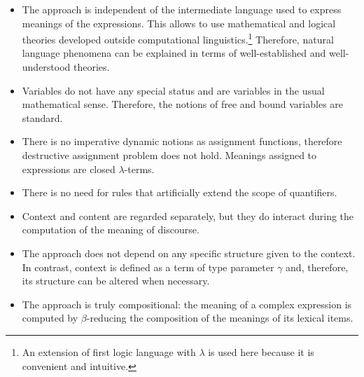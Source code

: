\begin{itemize}

\item The approach is independent of the intermediate language used to express meanings of the expressions. This allows to use mathematical and logical theories developed outside computational linguistics.\footnote{An extension of first logic language with $\lambda$ is used here because it is convenient and intuitive.} Therefore, natural language phenomena can be explained in terms of well-established and well-understood theories.

\item Variables do not have any special status and are variables in the usual mathematical sense. Therefore, the notions of free and bound variables are standard.  

\item There is no imperative dynamic notions as assignment functions, therefore destructive assignment problem does not hold. Meanings assigned to expressions are closed $\lambda$-terms. 

\item There is no need for rules that artificially extend the scope of quantifiers.

\item Context and content are regarded separately, but they do interact during the computation of the meaning of discourse.  

\item The approach does not depend on any specific structure given to the context. In contrast, context is defined as a term of type parameter $\gamma$ and, therefore, its structure can be altered when necessary.

\item The approach is truly compositional: the meaning of a complex expression is computed by $\beta$-reducing the composition of the meanings of its lexical items.

\end{itemize}
